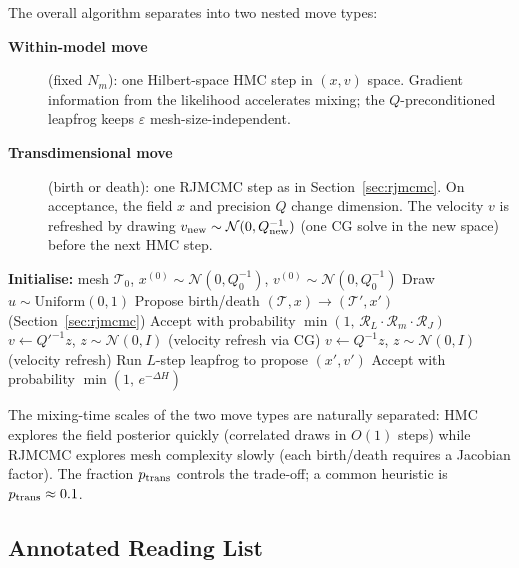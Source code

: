 \documentclass[11pt]{article}
\begin{document}
The overall algorithm separates into two nested move types:

\begin{description}
  \item[\textbf{Within-model move}] (fixed $N_m$): one Hilbert-space HMC step in
    $(x, v)$ space.  Gradient information from the likelihood accelerates mixing;
    the $Q$-preconditioned leapfrog keeps $\varepsilon$ mesh-size-independent.
  \item[\textbf{Transdimensional move}] (birth or death): one RJMCMC step as in
    Section~\ref{sec:rjmcmc}.  On acceptance, the field $x$ and precision $Q$
    change dimension.  The velocity $v$ is refreshed by drawing
    $v_{\rm new} \sim \mathcal{N}(0, Q_{\rm new}^{-1})$
    (one CG solve in the new space) before the next HMC step.
\end{description}

\begin{algorithm}[H]
\caption{Joint RJMCMC + Hilbert-Space HMC}
\label{alg:rj-hmc}
\begin{algorithmic}[1]
  \State \textbf{Initialise:} mesh $\mathcal{T}_0$, $x^{(0)} \sim \mathcal{N}(0, Q_0^{-1})$,
         $v^{(0)} \sim \mathcal{N}(0, Q_0^{-1})$
    \State Draw $u \sim \mathrm{Uniform}(0,1)$
      
      \State Propose birth/death $(\mathcal{T}, x) \to (\mathcal{T}', x')$ \hfill (Section~\ref{sec:rjmcmc})
      \State Accept with probability $\min(1,\, \mathcal{R}_L \cdot \mathcal{R}_m \cdot \mathcal{R}_J)$
        \State $v \leftarrow Q'^{-1} z$, \;$z \sim \mathcal{N}(0, I)$
        \hfill (velocity refresh via CG)
      \EndIf
    \Else {}
      \State $v \leftarrow Q^{-1}z$, \;$z \sim \mathcal{N}(0, I)$
            \hfill (velocity refresh)
      \State Run $L$-step leapfrog to propose $(x', v')$
      \State Accept with probability $\min(1,\, e^{-\Delta H})$
    \EndIf
  \EndFor
\end{algorithmic}
\end{algorithm}

\noindent
The mixing-time scales of the two move types are naturally separated: HMC
explores the field posterior quickly (correlated draws in $O(1)$ steps) while
RJMCMC explores mesh complexity slowly (each birth/death requires a Jacobian
factor).  The fraction $p_{\rm trans}$ controls the trade-off; a common heuristic
is $p_{\rm trans} \approx 0.1$.

\subsection{Annotated Reading List}
\label{sec:reading-list}
\end{document}
